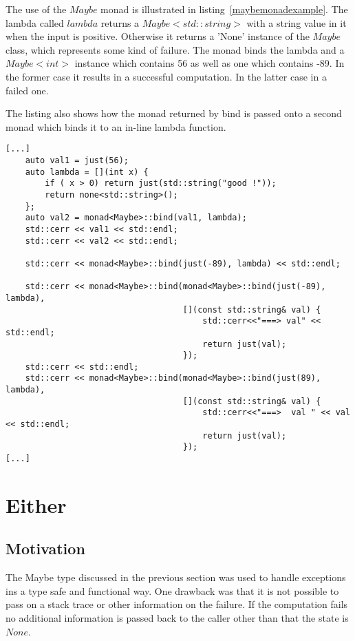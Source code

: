\documentclass[12pt,fleqn]{article}
\begin{document}
The use of the $Maybe$ monad is illustrated in listing~\ref{maybemonadexample}.
The lambda called $lambda$ returns a $Maybe<std::string>$ with a string value in it when the input is positive.
Otherwise it returns a 'None' instance of the $Maybe$ class, which represents some kind of failure.
The monad binds the lambda and a $Maybe<int>$ instance which contains 56 as well as one which contains -89.
In the former case it results in a successful computation.
In the latter case in a failed one.

The listing also shows how the monad returned by bind is passed onto a second monad which binds it to an in-line lambda function.

%
%
\begin{minipage}{\linewidth}
\begin{lstlisting}[caption=Maybe monad example, label=maybemonadexample]
[...]
	auto val1 = just(56);
	auto lambda = [](int x) {
		if ( x > 0) return just(std::string("good !"));
		return none<std::string>();
	};
	auto val2 = monad<Maybe>::bind(val1, lambda);
	std::cerr << val1 << std::endl;
	std::cerr << val2 << std::endl;

	std::cerr << monad<Maybe>::bind(just(-89), lambda) << std::endl;

	std::cerr << monad<Maybe>::bind(monad<Maybe>::bind(just(-89), lambda),
									[](const std::string& val) {
										std::cerr<<"===> val" << std::endl;
										return just(val);
									});
	std::cerr << std::endl;
	std::cerr << monad<Maybe>::bind(monad<Maybe>::bind(just(89), lambda),
									[](const std::string& val) {
										std::cerr<<"===>  val " << val << std::endl;
										return just(val);
									});
[...]
\end{lstlisting}
\end{minipage}
%
%
%


\section{Either}
%
%
%

\subsection{Motivation}
%
%

The Maybe type discussed in the previous section was used to handle exceptions ins a type safe and functional way.
One drawback was that it is not possible to pass on a stack trace or other information on the failure.  
If the computation fails no additional information is passed back to the caller other than that the state is $None$.
\end{document}
